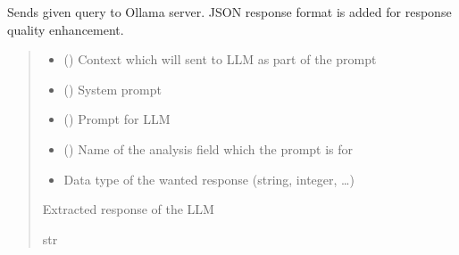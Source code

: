 \documentclass[letterpaper,10pt,english]{sphinxmanual}
\begin{document}

\begin{fulllineitems}
\label{\detokenize{llm_utils:llm_utils.llm_query}}
\pysigstartsignatures
\pysiglinewithargsret
{}
{\sphinxparamcomma {}\sphinxparamcomma {}\sphinxparamcomma {}\sphinxparamcomma {}}
{}
\pysigstopsignatures
\sphinxAtStartPar
Sends given query to Ollama server.
JSON response format is added for response quality enhancement.
\begin{quote}\begin{description}
\begin{itemize}
\item {} 
\sphinxAtStartPar
{} () \textendash{} Context which will sent to LLM as part of the prompt

\item {} 
\sphinxAtStartPar
{} () \textendash{} System prompt

\item {} 
\sphinxAtStartPar
{} () \textendash{} Prompt for LLM

\item {} 
\sphinxAtStartPar
{} () \textendash{} Name of the analysis field which the prompt is for

\item {} 
\sphinxAtStartPar
{} \textendash{} Data type of the wanted response (string, integer, …)

\end{itemize}

\sphinxAtStartPar
Extracted response of the LLM

\sphinxAtStartPar
str

\end{description}\end{quote}

\end{fulllineitems}
\end{document}
